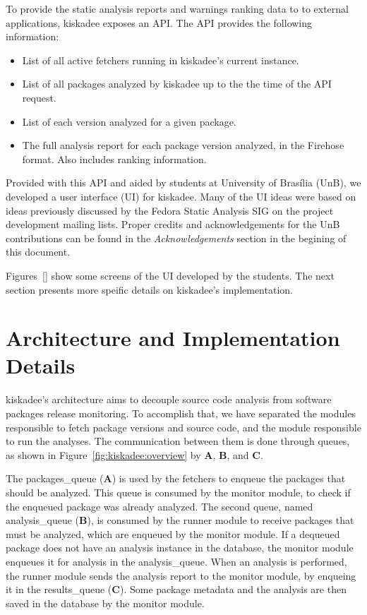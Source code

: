 To provide the static analysis reports and warnings ranking data to to external
applications, kiskadee exposes an API. The API provides the following information:

\begin{itemize}
  \item List of all active fetchers running in kiskadee's current instance.

  \item List of all packages analyzed by kiskadee up to the the time of the API request.

  \item List of each version analyzed for a given package.

  \item The full analysis report for each package version analyzed, in the Firehose format. Also includes ranking information.
\end{itemize}

Provided with this API and aided by students at University of Brasília (UnB),
we developed a user interface (UI) for kiskadee. Many of the UI ideas were
based on ideas previously discussed by the Fedora Static Analysis SIG on the
project development mailing lists. Proper credits and acknowledgements for the
UnB contributions can be found in the \emph{Acknowledgements} section in the
begining of this document.

Figures~\ref{} show some screens of the UI developed by the students. The next
section presents more speific details on kiskadee's implementation.


\section{Architecture and Implementation Details}
\label{sec:implementation}

kiskadee's architecture aims to decouple source code analysis from software
packages release monitoring. To accomplish that, we have separated the modules
responsible to fetch package versions and source code, and the module
responsible to run the analyses. The communication between them is done through
queues, as shown in Figure~\ref{fig:kiskadee:overview} by \textbf{A},
\textbf{B}, and \textbf{C}.

The packages\_queue (\textbf{A}) is used by the fetchers to enqueue the
packages that should be analyzed. This queue is consumed by the monitor module,
to check if the enqueued package was already analyzed. The second queue, named
analysis\_queue (\textbf{B}), is consumed by the runner module to receive
packages that must be analyzed, which are enqueued by the monitor module. If a
dequeued package does not have an analysis instance in the database, the
monitor module enqueues it for analysis in the analysis\_queue.  When an
analysis is performed, the runner module sends the analysis report to the
monitor module, by enqueing it in the results\_queue (\textbf{C}). Some package
metadata and the analysis are then saved in the database by the monitor module.

